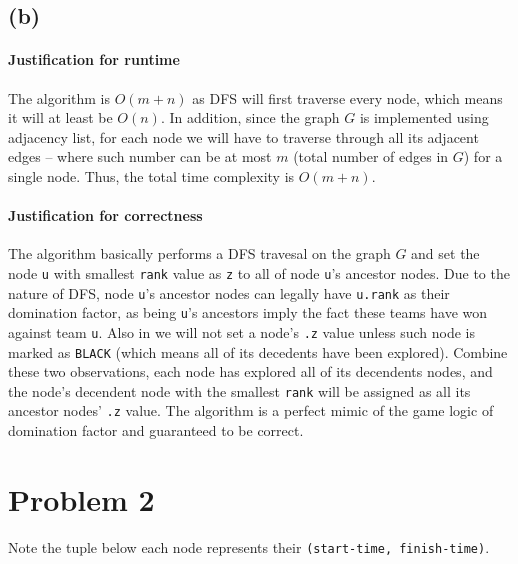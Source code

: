 \documentclass[11pt]{article}
\newcommand{\ilc}{\texttt}
\begin{document}
\subsection{(b)}

\paragraph{Justification for runtime} The algorithm is $O(m+n)$ as DFS will first traverse every node, which means it will at least be $O(n)$. In addition, since the graph $G$ is implemented using adjacency list, for each node we will have to traverse through all its adjacent edges -- where such number can be at most $m$ (total number of edges in $G$) for a single node. Thus, the total time complexity is $O(m + n)$.

\paragraph{Justification for correctness} The algorithm basically performs a DFS travesal on the graph $G$ and set the node \ilc{u} with smallest \ilc{rank} value as \ilc{z} to all of node \ilc{u}'s ancestor nodes. Due to the nature of DFS, node \ilc{u}'s ancestor nodes can legally have \ilc{u.rank} as their domination factor, as being \ilc{u}'s ancestors imply the fact these teams have won against team \ilc{u}. Also in  we will not set a node's \ilc{.z} value unless such node is marked as \ilc{BLACK} (which means all of its decedents have been explored). Combine these two observations, each node has explored all of its decendents nodes, and the node's decendent node with the smallest \ilc{rank} will be assigned as all its ancestor nodes' \ilc{.z} value. The algorithm is a perfect mimic of the game logic of domination factor and guaranteed to be correct.


\section{Problem 2}

Note the tuple below each node represents their \ilc{(start-time, finish-time)}.
\end{document}
